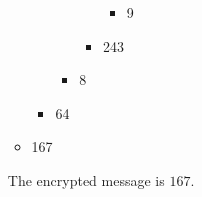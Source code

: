 \documentclass{article}
\begin{document}
\begin{enumerate}
\begin{itemize}
\begin{itemize}
\begin{itemize}
\begin{itemize}
\begin{itemize}
\begin{itemize}
                        \end{itemize}
                        \item 9
                    \end{itemize}
                    \item 243
                \end{itemize}
                \item 8
            \end{itemize}
            \item 64
        \end{itemize}
        \item 167
    \end{itemize}
    The encrypted message is $167$.
\end{enumerate}
\end{document}
